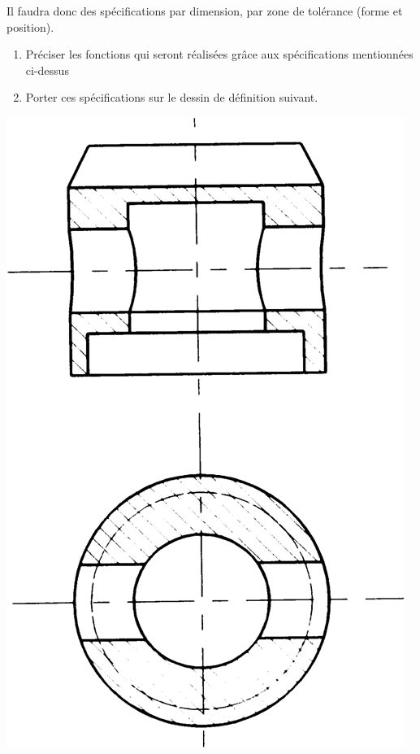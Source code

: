 \documentclass[11pt,oneside]{article}
\begin{document}
Il faudra donc des spécifications par dimension, par zone de tolérance (forme et position).

\begin{enumerate}
\item Préciser les fonctions qui seront réalisées grâce aux spécifications mentionnées ci-dessus
\item Porter ces spécifications sur le dessin de définition suivant.
\end{enumerate}


\begin{center}
\includegraphics[width=.55\textwidth]{png/piston}
\end{center}


\begin{thebibliography}{2}



\end{thebibliography}
\end{document}
